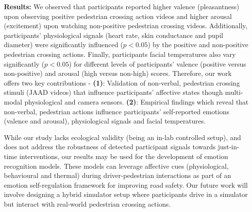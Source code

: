 \documentclass[acmlarge]{acmart}
\begin{document}
\noindent \textbf{Results:} 
We observed that participants reported higher valence (pleasantness) upon observing positive pedestrian crossing action videos and higher arousal (excitement) upon watching non-positive pedestrian crossing videos. Additionally, participants' physiological signals (heart rate, skin conductance and pupil diameter) were significantly influenced ($p<0.05$) by the positive and non-positive pedestrian crossing actions. Finally, participants facial temperatures also vary significantly ($p<0.05$) for different levels of participants' valence (positive versus non-positive) and arousal (high versus non-high) scores. Therefore, our work offers two key contributions - \textbf{(1)}: Validation of non-verbal, pedestrian crossing stimuli (JAAD videos) that influence participants' affective states though multi-modal physiological and camera sensors. \textbf{(2)}: Empirical findings which reveal that non-verbal, pedestrian actions influence participants' self-reported emotions (valence and arousal), physiological signals and facial temperatures. 

While our study lacks ecological validity (being an in-lab controlled setup), and does not address the robustness of detected participant signals towards just-in-time interventions, our results may be used for the development of emotion recognition models. These models can leverage affective cues (physiological, behavioural and thermal) during driver-pedestrian interactions as part of an emotion self-regulation framework for improving road safety. Our future work will involve designing a hybrid simulator setup where participants drive in a simulator but interact with real-world pedestrian crossing actions. 





\end{document}
